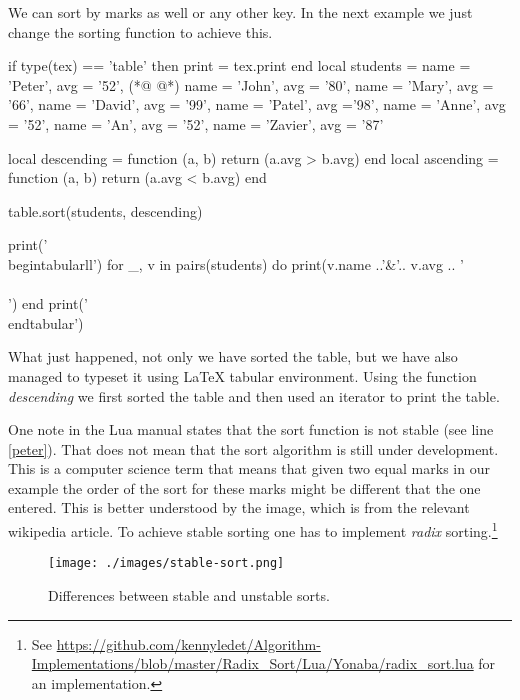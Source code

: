 We can sort by marks as well or any other key. In the next example we just change the sorting function to achieve this.


\begin{teX}
\begin{luacode}
if type(tex) == 'table' then print = tex.print end
local students = {
  {name = 'Peter', avg = '52'},  (*@\label{peter}  @*)
  {name = 'John', avg = '80'},
  {name = 'Mary', avg = '66'},
  {name = 'David', avg = '99'}, 
  {name = 'Patel', avg ='98'},
  {name = 'Anne', avg = '52'},
  {name = 'An', avg = '52'},
  {name = 'Zavier', avg = '87'} 
}

local descending = function (a, b) return (a.avg > b.avg) end
local ascending = function (a, b) return (a.avg < b.avg) end

table.sort(students, descending)   

print('\\begin{tabular}{ll}')
for _, v in pairs(students) do
   print(v.name ..'&'..  v.avg .. '\\\\')
end
print('\\end{tabular}')
\end{luacode}
\end{teX}

What just happened, not only we have sorted the table, but we have also managed to typeset it using LaTeX tabular environment. Using the function \emph{descending} we first sorted the table and then used an iterator to print the table.

One note in the Lua manual states that the sort function is not stable (see line \ref{peter}). That does not mean that the sort algorithm is still under development. This is a computer science term that means that given two equal marks in our example the order of the sort for these marks might be different that the one entered. This is better understood by the image, which is from the relevant wikipedia article. To achieve stable sorting one has to implement \emph{radix} sorting.\footnote{See \url{https://github.com/kennyledet/Algorithm-Implementations/blob/master/Radix_Sort/Lua/Yonaba/radix_sort.lua} for an implementation.}

\begin{figure}[htbp]
\centering

\texttt{[image: ./images/stable-sort.png]}
\caption{Differences between stable and unstable sorts.}
\end{figure}

